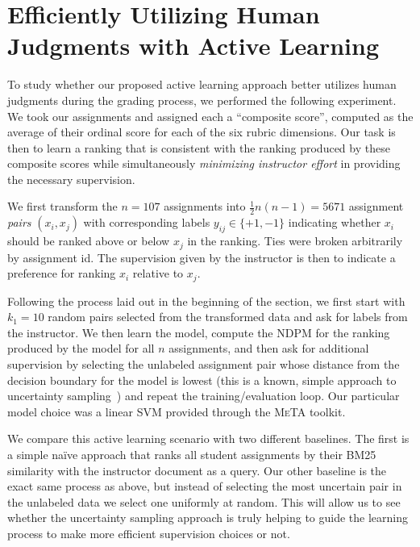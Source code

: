 \section{Efficiently Utilizing Human Judgments with Active Learning}
To study whether our proposed active learning approach better utilizes
human judgments during the grading process, we performed the following
experiment. We took our assignments and assigned each a ``composite
score'', computed as the average of their ordinal score for each of the six
rubric dimensions. Our task is then to learn a ranking that is consistent
with the ranking produced by these composite scores while simultaneously
\emph{minimizing instructor effort} in providing the necessary supervision.

We first transform the $n = 107$ assignments into $\frac{1}{2}n(n-1) =
5671$ assignment \emph{pairs} $(x_i, x_j)$ with corresponding labels
$y_{ij} \in \{+1, -1\}$ indicating whether $x_i$ should be ranked above or
below $x_j$ in the ranking. Ties were broken arbitrarily by assignment id.
The supervision given by the instructor is then to indicate a preference
for ranking $x_i$ relative to $x_j$.

Following the process laid out in the beginning of the section, we first
start with $k_1 = 10$ random pairs selected from the transformed data and
ask for labels from the instructor. We then learn the model, compute the
NDPM for the ranking produced by the model for all $n$ assignments, and
then ask for additional supervision by selecting the unlabeled assignment
pair whose distance from the decision boundary for the model is lowest
(this is a known, simple approach to uncertainty
sampling~\cite{Settles:2012}) and repeat the training/evaluation loop. Our
particular model choice was a linear SVM provided through the \textsc{MeTA}
toolkit.

We compare this active learning scenario with two different baselines. The
first is a simple na\"ive approach that ranks all student assignments by
their BM25 similarity with the instructor document as a query. Our other
baseline is the exact same process as above, but instead of selecting the
most uncertain pair in the unlabeled data we select one uniformly at
random. This will allow us to see whether the uncertainty sampling approach
is truly helping to guide the learning process to make more efficient
supervision choices or not.

